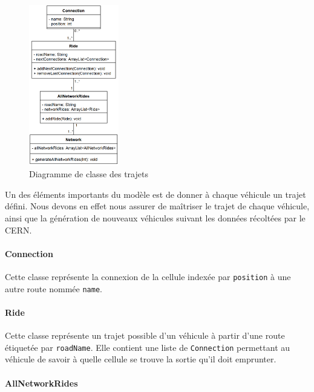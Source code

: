\documentclass[a4paper,11pt, titlepage]{extarticle}
\begin{document}
\begin{figure}
  \begin{center}
    \includegraphics[width=0.35\textwidth]{rides_diagram.png}
  \end{center}
  \caption{Diagramme de classe des trajets}
  \label{imgRides}
\end{figure}

Un des éléments importants du modèle est de donner à chaque véhicule un trajet défini. Nous devons en effet nous assurer de maîtriser le trajet de chaque véhicule, ainsi que la génération de nouveaux véhicules suivant les données récoltées par le CERN.

\paragraph{Connection}

Cette classe représente la connexion de la cellule indexée par \texttt{position} à une autre route nommée \texttt{name}.

\paragraph{Ride}

Cette classe représente un trajet possible d'un véhicule à partir d'une route étiquetée par \texttt{roadName}. Elle contient une liste de \texttt{Connection} permettant au véhicule de savoir à quelle cellule se trouve la sortie qu'il doit emprunter.

\paragraph{AllNetworkRides}
\end{document}
